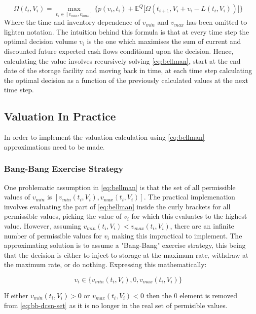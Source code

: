 \documentclass{article}
\begin{document}
\begin{equation}
    \label{eq:bellman}
    \Omega(t_i, V_i) = \max_{v_i \in [v_{min}, v_{max}]} \biggl\{ p(v_i, t_i) + \mathbb{E}^Q \biggl[
        \Omega(t_{i+1}, V_i + v_i - L(t_i, V_i)) \biggr] \biggr\}
\end{equation}
Where the time and inventory dependence of $v_{min}$ and $v_{max}$ has been omitted to lighten notation.
The intuition behind this formula is that at every time step the optimal decision volume $v_i$ 
is the one which maximises the sum of current and discounted future expected cash flows 
conditional upon the decision.
Hence, calculating the value involves recursively solving \ref{eq:bellman}, start at
the end date of the storage facility and moving back in time, at each time step calculating the
optimal decision as a function of the previously calculated values at the next time step.

\subsection{Valuation In Practice}
In order to implement the valuation calculation using \ref{eq:bellman} approximations need
to be made.

\subsubsection{Bang-Bang Exercise Strategy}
One problematic assumption in \ref{eq:bellman} is that the set of all permissible values of
$v_{min}$ is $[v_{min}(t_i, V_i), v_{max}(t_i, V_i)]$. The practical implemenation involves
evaluating the part of \ref{eq:bellman} inside the curly brackets for all permissible values,
picking the value of $v_i$ for which this evaluates to the highest value. However, assuming
$v_{min}(t_i, V_i) < v_{max}(t_i, V_i)$, there are an infinite number of permissible values for
$v_i$ making this impractical to implement. The approximating solution is to assume a 
"Bang-Bang" exercise strategy, this being that the decision is either to inject to storage
at the maximum rate, withdraw at the maximum rate, or do nothing. Expressing this mathematically:

\begin{equation}
    \label{eq:bb-dcsn-set}
    v_i \in \{v_{min}(t_i, V_i), 0, v_{max}(t_i, V_i)\}
\end{equation}

If either $v_{min}(t_i, V_i) > 0$ or $v_{max}(t_i, V_i) < 0$ then the 0 element is removed 
from \ref{eq:bb-dcsn-set} as it is no longer in the real set of permisible values.
\end{document}
